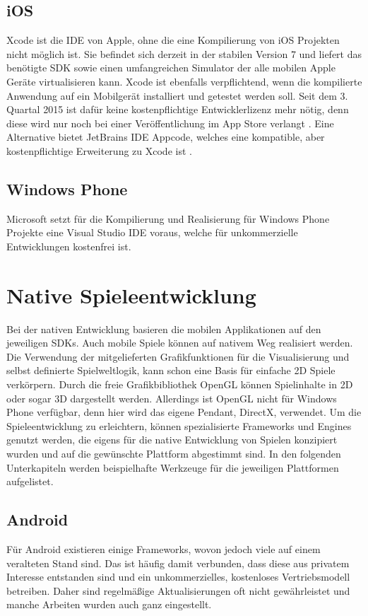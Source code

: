 \subsection{iOS}
Xcode ist die IDE von Apple, ohne die eine Kompilierung von iOS Projekten nicht möglich ist.
Sie befindet sich derzeit in der stabilen Version 7 und liefert das benötigte SDK sowie einen umfangreichen Simulator der alle mobilen Apple Geräte virtualisieren kann. Xcode ist ebenfalls verpflichtend, wenn die kompilierte Anwendung auf ein Mobilgerät installiert und getestet werden soll. Seit dem 3. Quartal 2015 ist dafür keine kostenpflichtige Entwicklerlizenz mehr nötig, denn diese wird nur noch bei einer Veröffentlichung im App Store verlangt \citep{t3n_xcode7}.
Eine Alternative bietet JetBrains IDE Appcode, welches eine kompatible, aber kostenpflichtige Erweiterung zu Xcode ist \citep{appcode}.

\subsection{Windows Phone}
Microsoft setzt für die Kompilierung und Realisierung für Windows Phone Projekte eine Visual Studio IDE voraus, welche für unkommerzielle Entwicklungen kostenfrei ist.

\section{Native Spieleentwicklung}
Bei der nativen Entwicklung basieren die mobilen Applikationen auf den jeweiligen SDKs. Auch mobile Spiele können auf nativem Weg realisiert werden. Die Verwendung der mitgelieferten Grafikfunktionen für die Visualisierung und selbst definierte Spielweltlogik, kann schon eine Basis für einfache 2D Spiele verkörpern. Durch die freie Grafikbibliothek OpenGL können Spielinhalte in 2D oder sogar 3D dargestellt werden. Allerdings ist OpenGL nicht für Windows Phone verfügbar, denn hier wird das eigene Pendant, DirectX, verwendet. Um die Spieleentwicklung zu erleichtern, können spezialisierte Frameworks und Engines genutzt werden, die eigens für die native Entwicklung von Spielen konzipiert wurden und auf die gewünschte Plattform abgestimmt sind. In den folgenden Unterkapiteln werden beispielhafte Werkzeuge für die jeweiligen Plattformen aufgelistet.
 
\subsection{Android}
Für Android existieren einige Frameworks, wovon jedoch viele auf einem veralteten Stand sind. Das ist häufig damit verbunden, dass diese aus privatem Interesse entstanden sind und ein unkommerzielles, kostenloses Vertriebsmodell betreiben. Daher sind regelmäßige Aktualisierungen oft nicht gewährleistet und manche Arbeiten wurden auch ganz eingestellt.

